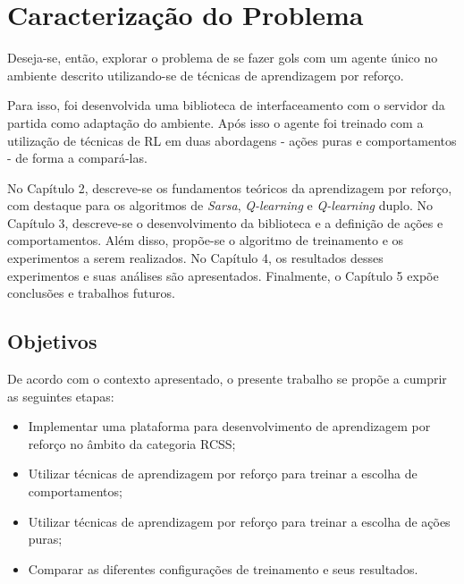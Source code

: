 \section{Caracterização do Problema}
\par Deseja-se, então, explorar o problema de se fazer gols com um agente único no ambiente descrito utilizando-se de técnicas de aprendizagem por reforço.
\par Para isso, foi desenvolvida uma biblioteca de interfaceamento com o servidor da partida como adaptação do ambiente. Após isso o agente foi treinado com a utilização de técnicas de RL em duas abordagens - ações puras e comportamentos - de forma a compará-las.
\par No Capítulo 2, descreve-se os fundamentos teóricos da aprendizagem por reforço, com destaque para os algoritmos de \textit{Sarsa}, \textit{Q-learning} e \textit{Q-learning} duplo. No Capítulo 3, descreve-se o desenvolvimento da biblioteca e a definição de ações e comportamentos. Além disso, propõe-se o algoritmo de treinamento e os experimentos a serem realizados. No Capítulo 4, os resultados desses experimentos e suas análises são apresentados. Finalmente, o Capítulo 5 expõe conclusões e trabalhos futuros.

\subsection{Objetivos}
\par De acordo com o contexto apresentado, o presente trabalho se propõe a cumprir as seguintes etapas:
\begin{itemize}
	\item Implementar uma plataforma para desenvolvimento de aprendizagem por reforço no âmbito da categoria RCSS;
	\item Utilizar técnicas de aprendizagem por reforço para treinar a escolha de comportamentos;
	\item Utilizar técnicas de aprendizagem por reforço para treinar a escolha de ações puras;
	\item Comparar as diferentes configurações de treinamento e seus resultados.
\end{itemize}

